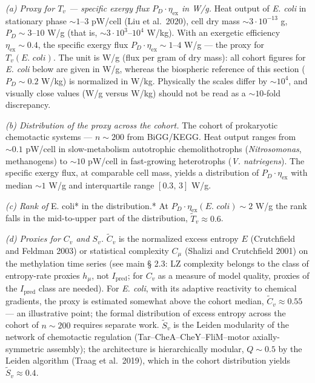 \documentclass[pdflatex,sn-mathphys-ay]{sn-jnl}
\begin{document}
\emph{(a) Proxy for \(T_v\) --- specific exergy flux \(P_D \cdot \eta_{\text{ex}}\) in W/g.} Heat output of \emph{E. coli} in stationary phase \(\sim 1\)--\(3\) pW/cell (Liu et al.~2020), cell dry mass \(\sim 3 \cdot 10^{-13}\) g, \(P_D \sim 3\)--\(10\) W/g (that is, \(\sim 3 \cdot 10^{3}\)--\(10^{4}\) W/kg). With an exergetic efficiency \(\eta_{\text{ex}} \sim 0.4\), the specific exergy flux \(P_D \cdot \eta_{\text{ex}} \sim 1\)--\(4\) W/g --- the proxy for \(T_v(\textit{E. coli})\). The unit is W/g (flux per gram of dry mass): all cohort figures for \emph{E. coli} below are given in W/g, whereas the biospheric reference of this section (\(P_D \sim 0.2\) W/kg) is normalized in W/kg. Physically the scales differ by \(\sim\!10^{4}\), and visually close values (W/g versus W/kg) should not be read as a \(\sim\!10\)-fold discrepancy.

\emph{(b) Distribution of the proxy across the cohort.} The cohort of prokaryotic chemotactic systems --- \(n \sim 200\) from BiGG/KEGG. Heat output ranges from \(\sim 0.1\) pW/cell in slow-metabolism autotrophic chemolithotrophs (\emph{Nitrosomonas}, methanogens) to \(\sim 10\) pW/cell in fast-growing heterotrophs (\emph{V. natriegens}). The specific exergy flux, at comparable cell mass, yields a distribution of \(P_D \cdot \eta_{\text{ex}}\) with median \(\sim 1\) W/g and interquartile range \([0.3,\, 3]\) W/g.

\emph{(c) Rank of }E. coli* in the distribution.* At \(P_D \cdot \eta_{\text{ex}}(\textit{E. coli}) \sim 2\) W/g the rank falls in the mid-to-upper part of the distribution, \(\tilde{T}_v \approx 0.6\).

\emph{(d) Proxies for \(C_v\) and \(S_v\).} \(\tilde{C}_v\) is the normalized excess entropy \(E\) (Crutchfield and Feldman 2003) or statistical complexity \(C_\mu\) (Shalizi and Crutchfield 2001) on the methylation time series (see main § 2.3: LZ complexity belongs to the class of entropy-rate proxies \(h_\mu\), not \(I_{\text{pred}}\); for \(C_v\) as a measure of model quality, proxies of the \(I_{\text{pred}}\) class are needed). For \emph{E. coli}, with its adaptive reactivity to chemical gradients, the proxy is estimated somewhat above the cohort median, \(\tilde{C}_v \approx 0.55\) --- an illustrative point; the formal distribution of excess entropy across the cohort of \(n \sim 200\) requires separate work. \(\tilde{S}_v\) is the Leiden modularity of the network of chemotactic regulation (Tar--CheA--CheY--FliM--motor axially-symmetric assembly); the architecture is hierarchically modular, \(Q \sim 0.5\) by the Leiden algorithm (Traag et al.~2019), which in the cohort distribution yields \(\tilde{S}_v \approx 0.4\).
\end{document}
